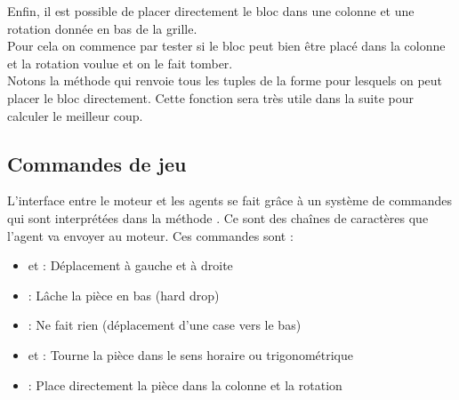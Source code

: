 \medskip

Enfin, il est possible de placer directement le bloc dans une colonne et une rotation donnée en bas de la grille.\\
Pour cela on commence par tester si le bloc peut bien être placé dans la colonne et la rotation voulue et on le fait tomber.\\
Notons la méthode  qui renvoie tous les tuples de la forme  pour lesquels on peut placer le bloc directement. Cette fonction sera très utile dans la suite pour calculer le meilleur coup.

\subsection{Commandes de jeu}
\label{commande_de_jeu}
L'interface entre le moteur et les agents se fait grâce à un système de commandes qui sont interprétées dans la méthode . Ce sont des chaînes de caractères que l'agent va envoyer au moteur. Ces commandes sont :
\begin{itemize}
	\item {} et  : Déplacement à gauche et à droite
	\item {} : Lâche la pièce en bas (hard drop)
	\item {} : Ne fait rien (déplacement d'une case vers le bas)
	\item {} et  : Tourne la pièce dans le sens horaire ou trigonométrique
	\item {} : Place directement la pièce dans la colonne  et la rotation 
\end{itemize}

\newpage

